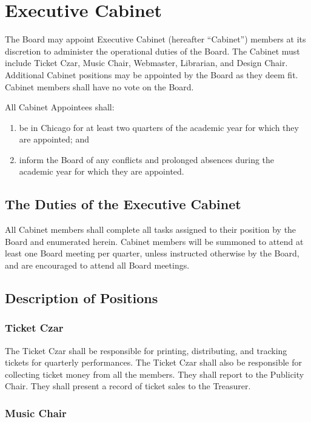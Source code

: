 \documentclass{article}
\begin{document}
\section{Executive Cabinet}

The Board may appoint Executive Cabinet (hereafter ``Cabinet'') members at its
discretion to administer the operational duties of the Board. The Cabinet must
include Ticket Czar, Music Chair, Webmaster, Librarian, and Design
Chair. Additional Cabinet positions may be appointed by the Board as they deem
fit. Cabinet members shall have no vote on the Board.

All Cabinet Appointees shall:
\begin{enumerate}
\item be in Chicago for at least two quarters of the academic year for which
they are appointed; and
\item inform the Board of any conflicts and prolonged absences
during the academic year for which they are appointed.
\end{enumerate}

\subsection{The Duties of the Executive Cabinet}

All Cabinet members shall complete all tasks assigned to their position by the
Board and enumerated herein. Cabinet members will be summoned to
attend at least one Board meeting per quarter, unless instructed
otherwise by the Board, and are encouraged to attend all
Board meetings.

\subsection{Description of Positions}


\subsubsection{Ticket Czar}

The Ticket Czar shall be responsible for printing, distributing, and tracking
tickets for quarterly performances. The Ticket Czar shall also be responsible
for collecting ticket money from all the members. They shall report to the
Publicity Chair. They shall present a record of ticket sales to the Treasurer.


\subsubsection{Music Chair}
\end{document}
